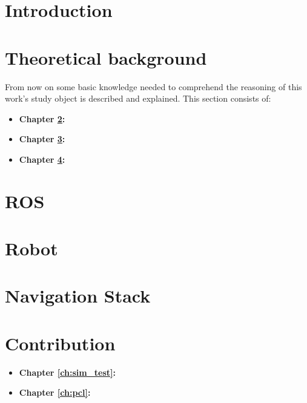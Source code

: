 \documentclass{Configuration_Files/PoliMi3i_thesis}
\begin{document}
\mainmatter %

\chapter{Introduction}
\label{intro}


\chapter*{Theoretical background}
From now on some basic knowledge needed to comprehend the reasoning of this work's study object is described and explained. 
This section consists of:
\begin{itemize}
    \item \textbf{Chapter \ref{ch:ros}:} 
    \item \textbf{Chapter \ref{ch:robot}:} 
    \item \textbf{Chapter \ref{ch:nav_stack}:} 
\end{itemize}

\chapter{ROS}
\label{ch:ros}


\chapter{Robot}
\label{ch:robot}


\chapter{Navigation Stack}
\label{ch:nav_stack}


\chapter*{Contribution}
\begin{itemize}
    \item \textbf{Chapter \ref{ch:sim_test}: }
    \item \textbf{Chapter \ref{ch:pcl}: }
\end{itemize}
\end{document}

